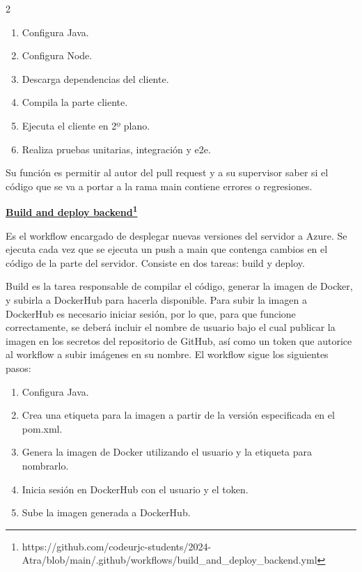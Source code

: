 \begin{multicols}{2}
\begin{enumerate}
    \item Configura Java.
    \item Configura Node.
    \item Descarga dependencias del cliente.
    \item Compila la parte cliente.
    \item Ejecuta el cliente en 2º plano.
    \item Realiza pruebas unitarias, integración y e2e.
\end{enumerate}
\end{multicols}

Su función es permitir al autor del pull request y a su supervisor saber si el código que se va a portar a la rama main contiene errores o regresiones.

\textbf{\href{https://github.com/codeurjc-students/2024-Atra/blob/main/.github/workflows/build_and_deploy_backend.yml}{\uline{Build and deploy backend}\footnote{\url{https://github.com/codeurjc-students/2024-Atra/blob/main/.github/workflows/build_and_deploy_backend.yml}}}}

Es el workflow encargado de desplegar nuevas versiones del servidor a Azure. Se ejecuta cada vez que se ejecuta un push a main que contenga cambios en el código de la parte del servidor. Consiste en dos tareas: build y deploy.

Build es la tarea responsable de compilar el código, generar la imagen de Docker, y subirla a DockerHub para hacerla disponible. Para subir la imagen a DockerHub es necesario iniciar sesión, por lo que, para que funcione correctamente, se deberá incluir el nombre de usuario bajo el cual publicar la imagen en los secretos del repositorio de GitHub, así como un token que autorice al workflow a subir imágenes en su nombre. El workflow sigue los siguientes pasos:
\begin{enumerate}
    \item Configura Java.
    \item Crea una etiqueta para la imagen a partir de la versión especificada en el pom.xml.
    \item Genera la imagen de Docker utilizando el usuario y la etiqueta para nombrarlo.
    \item Inicia sesión en DockerHub con el usuario y el token.
    \item Sube la imagen generada a DockerHub.
\end{enumerate}

